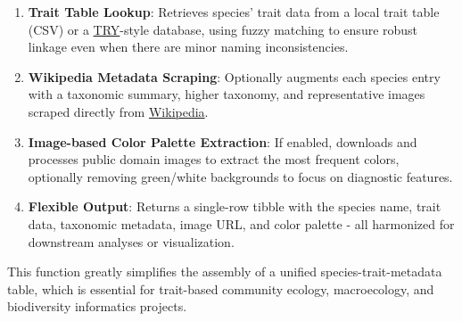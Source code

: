 \documentclass[
]{article}
\providecommand{\tightlist}{%
  \setlength{\itemsep}{0pt}\setlength{\parskip}{0pt}}
\begin{document}
\begin{enumerate}
\def\labelenumi{\arabic{enumi}.}
\tightlist
\item
  \textbf{Trait Table Lookup}: Retrieves species' trait data from a
  local trait table (CSV) or a
  \href{https://www.try-db.org/TryWeb/Home.php}{TRY}-style database,
  using fuzzy matching to ensure robust linkage even when there are
  minor naming inconsistencies.
\item
  \textbf{Wikipedia Metadata Scraping}: Optionally augments each species
  entry with a taxonomic summary, higher taxonomy, and representative
  images scraped directly from
  \href{https://www.wikipedia.org/}{Wikipedia}.
\item
  \textbf{Image-based Color Palette Extraction}: If enabled, downloads
  and processes public domain images to extract the most frequent
  colors, optionally removing green/white backgrounds to focus on
  diagnostic features.
\item
  \textbf{Flexible Output}: Returns a single-row tibble with the species
  name, trait data, taxonomic metadata, image URL, and color palette -
  all harmonized for downstream analyses or visualization.
\end{enumerate}

This function greatly simplifies the assembly of a unified
species-trait-metadata table, which is essential for trait-based
community ecology, macroecology, and biodiversity informatics projects.
\end{document}
